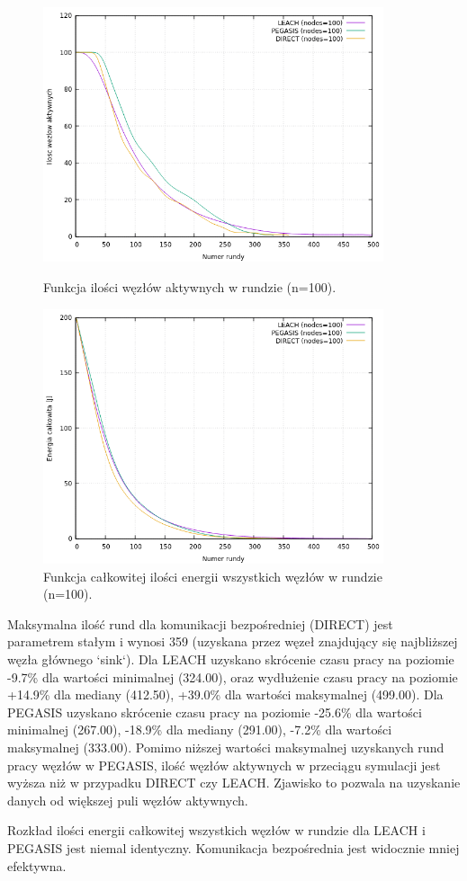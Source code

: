 \documentclass[a4paper,12pt,twoside,openany]{report}
\begin{document}
\begin{figure}[H]
 \centering
 \includegraphics[width=10cm]{images/gnuplot/test_2/nodes_in_round_100.png}
 \caption{Funkcja ilości węzłów aktywnych w rundzie (n=100).}
 \includegraphics[width=10cm]{images/gnuplot/test_2/energy_in_round_100.png}
 \caption{Funkcja całkowitej ilości energii wszystkich węzłów w rundzie (n=100).}
\end{figure}

\par
Maksymalna ilość rund dla komunikacji bezpośredniej (DIRECT) jest parametrem stałym i wynosi 359 (uzyskana przez węzeł znajdujący się najbliższej węzła głównego `sink`).
Dla LEACH uzyskano skrócenie czasu pracy na poziomie -9.7\% dla wartości minimalnej (324.00), oraz wydłużenie czasu pracy na poziomie +14.9\% dla mediany (412.50), +39.0\% dla wartości maksymalnej (499.00).
Dla PEGASIS uzyskano skrócenie czasu pracy na poziomie -25.6\% dla wartości minimalnej (267.00), -18.9\% dla mediany (291.00), -7.2\% dla wartości maksymalnej (333.00).
Pomimo niższej wartości maksymalnej uzyskanych rund pracy węzłów w PEGASIS, ilość węzłów aktywnych w przeciągu symulacji jest wyższa niż w przypadku DIRECT czy LEACH.
Zjawisko to pozwala na uzyskanie danych od większej puli węzłów aktywnych.
\par
Rozkład ilości energii całkowitej wszystkich węzłów w rundzie dla LEACH i PEGASIS jest niemal identyczny. Komunikacja bezpośrednia jest widocznie mniej efektywna.
\end{document}
